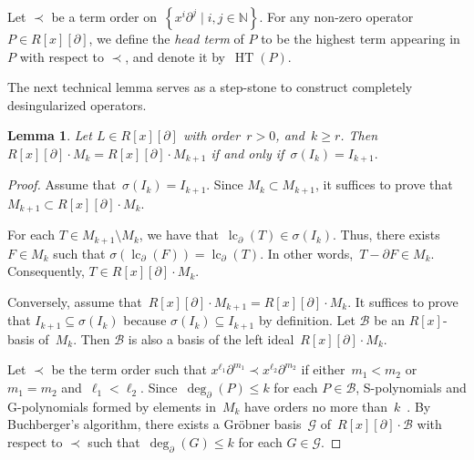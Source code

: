 \documentclass{sig-alternate}
\newcommand{\bN} { {\mathbb{N}}}
\newcommand{\lc}{\operatorname{lc}}
\newcommand{\si} { {\sigma}}
\newcommand{\pa}{\partial}
\newtheorem{lemma}[theorem]{Lemma}
\begin{document}
Let $\prec$ be a term order on~$\left\{x^i\pa^j \mid i, j \in \bN \right\}$. For any non-zero operator $P \in R[x][\pa]$, we define the {\em head term}
of $P$ to be the highest term appearing in~$P$ with respect to $\prec$, and denote it by~$\operatorname{HT}(P)$.

The next technical  lemma serves as a step-stone to construct completely desingularized operators.
\begin{lemma}\label{LM:sc}
Let $L \in R[x][\pa]$ with order~$r>0$, and~$k \ge r$. Then
$R[x][\pa] \cdot M_k {=} R[x][\pa] \cdot M_{k + 1}$ if and only if~$\si(I_k) {=} I_{k + 1}.$
\end{lemma}
\begin{proof}
Assume that~$\si(I_k) = I_{k + 1}$. Since $M_k \subset M_{k + 1}$, it suffices to prove
that~$M_{k + 1} \subset R[x][\pa] \cdot M_k$.

For each $T \in M_{k + 1} \setminus M_k$,  we have that~$\lc_{\pa}(T) \in \si(I_k)$.
Thus, there exists $F \in M_k$ such that $\si(\lc_{\pa}(F)) = \lc_{\pa}(T)$.
In other words,~$T - \pa F \in M_k$. Consequently, $T \in R[x][\pa] \cdot M_k$.

Conversely, assume that~$R[x][\pa] \cdot M_{k + 1}= R[x][\pa] \cdot M_k$.
It suffices to prove that $I_{k + 1} \subseteq \si(I_k)$ because $\si(I_k) \subseteq I_{k + 1}$ by definition.
Let $\mathcal{B}$ be an $R[x]$-basis of~$M_k$. Then $\mathcal{B}$ is also a basis of the left ideal~$R[x][\pa] \cdot M_k$.

Let $\prec$ be the term order such that
$x^{\ell_1} \pa^{m_1} {\prec} x^{\ell_2} \pa^{m_2}$ if either~$m_1 {<} m_2$ or~$m_1 {=} m_2$ and~$\ell_1 {<} \ell_2$.
Since~$\deg_{\pa}(P) {\leq} k$ for each $P \in \mathcal{B}$, S-polynomials and G-polynomials formed by elements in~$M_k$
have orders no more than~$k$~\cite[Definition 10.9]{Weispfenning1993}.  By Buchberger's algorithm, there exists a Gr\"{o}bner basis~$\mathcal{G}$ of~$R[x][\pa] \cdot \mathcal{B}$ with respect to $\prec$ such that~$\deg_{\pa}(G) \leq k$ for each $G \in \mathcal{G}$.


\end{proof}
\end{document}
